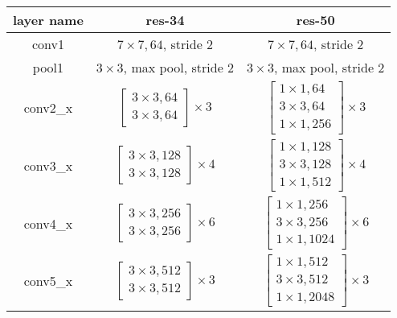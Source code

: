\documentclass[a4paper]{article}
\begin{document}
\begin{table}[ht]
\footnotesize
\centering
\begin{tabular}{ c|c|c }
\textbf{layer name} & \textbf{res-34}  & \textbf{res-50}   \\ \hline
conv1 & $ 7 \times 7,64$, stride 2 & $ 7 \times 7,64$, stride 2\\ 
pool1 &  $ 3 \times 3$, max pool, stride 2 &  $ 3 \times 3$, max pool, stride 2 \\  \hline
conv2\_x & $\begin{bmatrix}  3 \times 3, 64 \\ 3 \times 3, 64 \end{bmatrix} \times 3 $   & $\begin{bmatrix}  1 \times 1, 64 \\ 3 \times 3, 64 \\  1 \times 1, 256 \end{bmatrix} \times 3 $          \\\hline
conv3\_x &$\begin{bmatrix}  3 \times 3,128 \\ 3 \times 3,128 \end{bmatrix} \times 4 $  & $\begin{bmatrix}  1 \times 1, 128 \\ 3 \times 3, 128 \\  1 \times 1, 512\end{bmatrix} \times 4 $           \\\hline
conv4\_x & $\begin{bmatrix}  3 \times 3,256 \\ 3 \times 3,256 \end{bmatrix} \times 6 $   & $\begin{bmatrix}  1 \times 1, 256 \\  3 \times 3, 256 \\  1 \times 1, 1024 \end{bmatrix} \times 6 $          \\\hline
conv5\_x &$\begin{bmatrix}  3 \times 3,512 \\ 3 \times 3,512 \end{bmatrix} \times 3 $     & $\begin{bmatrix}  1 \times 1, 512 \\ 3 \times 3, 512 \\ 1 \times 1, 2048 \end{bmatrix} \times 3 $            \\\hline

\end{tabular}
\end{table}
\end{document}
